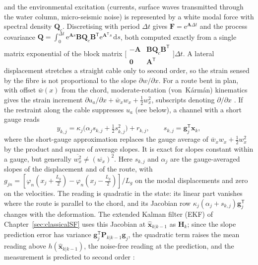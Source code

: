 \documentclass[graybox,envcountchap]{style/SNmono}
\providecommand{\DIFadd}[1]{{\protect\color{blue} #1}} %
\providecommand{\DIFaddbegin}{} %
\providecommand{\DIFaddend}{} %
\begin{document}
and the environmental excitation (currents, surface waves transmitted through the water column, micro-seismic noise) is represented by a white modal force with spectral density $\mathbf{Q}_c$. Discretising with period $\Delta t$ gives $\mathbf{F}=\mathrm{e}^{\mathbf{A}\Delta t}$ and the process covariance $\mathbf{Q}=\int_0^{\Delta t}\mathrm{e}^{\mathbf{A}s}\mathbf{B}\mathbf{Q}_c\mathbf{B}^{\mathsf T}\mathrm{e}^{\mathbf{A}^{\mathsf T}s}\,\mathrm{d}s$, both computed exactly from a single matrix exponential of the block matrix $\bigl[\begin{smallmatrix}-\mathbf{A} & \mathbf{B}\mathbf{Q}_c\mathbf{B}^{\mathsf T}\\ \mathbf{0} & \mathbf{A}^{\mathsf T}\end{smallmatrix}\bigr]\Delta t$. 
A lateral displacement stretches a straight cable only to second order, so the strain sensed by the fibre is not proportional to the slope $\partial w/\partial x$. For a route bent in plan, with offset $\bar w(x)$ from the chord, moderate-rotation (von~K\'arm\'an) kinematics gives the strain increment $\partial u_a/\partial x+\bar w_x w_x+\tfrac12 w_x^{2}$, subscripts denoting $\partial/\partial x$ \cite{irvine_linear_1974,rega_cables_2004}. If the restraint along the cable suppresses $u_a$ (see below), a channel with a short gauge reads
\begin{equation}
y_{k,j}=\kappa_j\bigl(\alpha_j s_{k,j}+\tfrac12 s_{k,j}^{2}\bigr)+r_{k,j},
\qquad
s_{k,j}=\mathbf{g}_j^{\mathsf T}\mathbf{x}_k,
\label{eq:ch07-strain-channel}
\end{equation}
where \DIFaddbegin \DIFadd{the short-gauge approximation replaces the gauge average of $\bar w_x w_x+\tfrac12w_x^2$ by the product and square of average slopes. It is exact for slopes constant within a gauge, but generally $\overline{w_x^2}\ne(\overline{w_x})^2$. Here }\DIFaddend $s_{k,j}$ and $\alpha_j$ are the gauge-averaged slopes of the displacement and of the route, with $g_{jn}=[\varphi_n(x_j+\tfrac{L_g}{2})-\varphi_n(x_j-\tfrac{L_g}{2})]/L_g$ on the modal displacements and zero on the velocities. The reading is quadratic in the state: its linear part vanishes where the route is parallel to the chord, and its Jacobian row $\kappa_j(\alpha_j+s_{k,j})\mathbf{g}_j^{\mathsf T}$ changes with the deformation. The extended Kalman filter (EKF) of Chapter~\ref{sec:classicalSF} uses this Jacobian at $\widehat{\mathbf{x}}_{k|k-1}$ as $\mathbf{H}_k$; since the slope prediction error has variance $\mathbf{g}_j^{\mathsf T}\mathbf{P}_{k|k-1}\mathbf{g}_j$, the quadratic term raises the mean reading above $h(\widehat{\mathbf{x}}_{k|k-1})$, the noise-free reading at the prediction, and the measurement is predicted to second order \cite{jazwinski_1970}:
\end{document}
